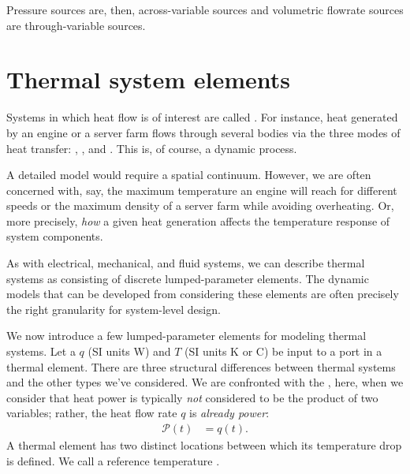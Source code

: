 \documentclass[dynamic_systems.tex]{subfiles}
\begin{document}
Pressure sources are, then, across-variable sources and volumetric flowrate sources are through-variable sources.


\section{Thermal system elements}
\tags{}

Systems in which heat flow is of interest are called . 
For instance, heat generated by an engine or a server farm flows through several bodies via the three modes of heat transfer: , , and .
This is, of course, a dynamic process.
\tags{}

A detailed model would require a spatial continuum.
However, we are often concerned with, say, the maximum temperature an engine will reach for different speeds or the maximum density of a server farm while avoiding overheating.
Or, more precisely, \emph{how} a given heat generation affects the temperature response of system components.
\tags{}

As with electrical, mechanical, and fluid systems, we can describe thermal systems as consisting of discrete lumped-parameter elements.
The dynamic models that can be developed from considering these elements are often precisely the right granularity for system-level design.
\tags{}

We now introduce a few lumped-parameter elements for modeling thermal systems.
Let a  $q$ (SI units W) and  $T$ (SI units K or C) be input to a port in a thermal element.
There are three structural differences between thermal systems and the other types we've considered.
We are confronted with the , here, when we consider that heat power is typically \emph{not} considered to be the product of two variables; rather, the heat flow rate $q$ is \emph{already power}:
\begin{align}
	\mathcal{P}(t) &= q(t).
\end{align}
A thermal element has two distinct locations between which its temperature drop is defined.
We call a reference temperature .
\end{document}
